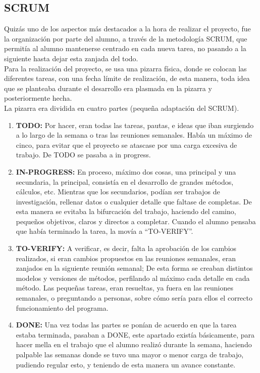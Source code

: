 \subsection{SCRUM}
Quizás uno de los aspectos más destacados a la hora de realizar el proyecto, fue la organización por parte del alumno, a través de la metodología SCRUM, que permitía al alumno mantenerse centrado en cada nueva tarea, no pasando a la siguiente hasta dejar esta zanjada del todo. \\

Para la realización del proyecto, se usa una pizarra física, donde se colocan las diferentes tareas, con una fecha límite de realización, de esta manera, toda idea que se planteaba durante el desarrollo era plasmada en la pizarra y posteriormente hecha. \\
La pizarra era dividida en cuatro partes (pequeña adaptación del SCRUM).\\
\begin{enumerate}
\item	\textbf{TODO:} Por hacer, eran todas las tareas, pautas, e ideas que iban surgiendo a lo largo de la semana o tras las reuniones semanales. Había un máximo de cinco, para evitar que el proyecto se atascase por una carga excesiva de trabajo. De TODO se pasaba a in progress. 
\item	\textbf{IN-PROGRESS:} En proceso, máximo dos cosas, una principal y una secundaria, la principal, consistía en el desarrollo de grandes métodos, cálculos, etc. Mientras que los secundarios, podían ser trabajos de investigación, rellenar datos o cualquier detalle que faltase de completas. De esta manera se evitaba la bifurcación del trabajo, haciendo del camino, pequeños objetivos, claros y directos a completar. Cuando el alumno pensaba que había terminado la tarea, la movía a “TO-VERIFY”.
\item	\textbf{TO-VERIFY:} A verificar, es decir, falta la aprobación de los cambios realizados, si eran cambios propuestos en las reuniones semanales, eran zanjados en la siguiente reunión semanal; De esta forma se creaban distintos modelos y versiones de métodos, perfilando al máximo cada detalle en cada método. Las pequeñas tareas, eran resueltas, ya fuera en las reuniones semanales, o preguntando a personas, sobre cómo sería para ellos el correcto funcionamiento del programa.
\item	\textbf{DONE:} Una vez todas las partes se ponían de acuerdo en que la tarea estaba terminada, pasaban a DONE, este apartado existía básicamente, para hacer mella en el trabajo que el alumno realizó durante la semana, haciendo palpable las semanas donde se tuvo una mayor o menor carga de trabajo, pudiendo regular esto, y teniendo de esta manera un avance constante.
\end{enumerate}
